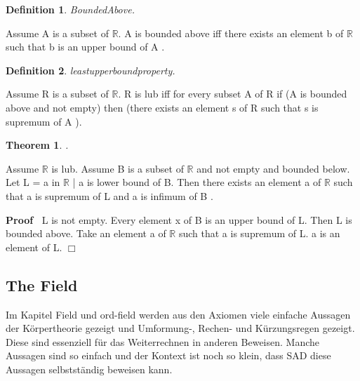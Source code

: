 \documentclass{article}
\newenvironment{forthel}{\begin{leftbar}}{\end{leftbar}}
\newenvironment{proof}{\noindent\textbf{Proof\ }}{\hspace*{\fill}$\Box$\medskip}
\newtheorem{theorem}{Theorem}
\newtheorem{definition}{Definition}
\begin{document}
\begin{forthel}
\begin{definition} BoundedAbove.

\end{definition}
Assume A is a subset of $\mathbb{R}$.
A is bounded above  iff 
there exists an element b of $\mathbb{R}$ such that b is an upper bound of A .

\begin{definition} leastupperboundproperty.

\end{definition}
Assume R is a subset of $\mathbb{R}$.
R is lub iff for every subset A of R
if (A is bounded above and not empty) then (there exists an element s of R such that s is supremum of A ).

\begin{theorem}
.
\end{theorem}
Assume $\mathbb{R}$ is lub.
Assume B is a subset of $\mathbb{R}$ and not empty and bounded below.
Let L = {a in $\mathbb{R}$ | a is lower bound of B}.
Then there exists an element a of $\mathbb{R}$ such that a is supremum of L and a is infimum of B .

\begin{proof}
L is not empty.
Every element x of B is an upper bound of L.
Then L is bounded above.
Take an element a of $\mathbb{R}$ such that a is supremum of L.
a is an element of L.
\end{proof}





\end{forthel}

\subsection{The Field}

Im Kapitel Field und ord-field werden aus den Axiomen viele einfache Aussagen der K\"orpertheorie gezeigt und Umformung-, Rechen- und K\"urzungsregen gezeigt. Diese sind essenziell f\"ur das Weiterrechnen in anderen Beweisen.
Manche Aussagen sind so einfach und der Kontext ist noch so klein, dass SAD diese Aussagen selbstst\"andig beweisen kann.
\end{document}
